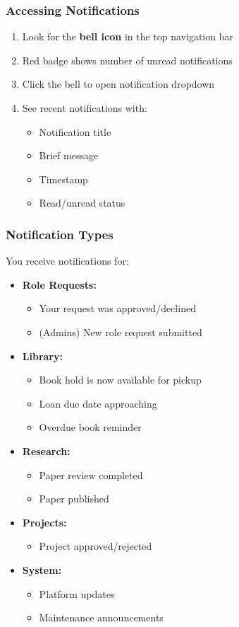 \documentclass[12pt,a4paper]{article}
\begin{document}
\subsubsection{Accessing Notifications}
\begin{enumerate}[leftmargin=*]
    \item Look for the \textbf{bell icon} in the top navigation bar
    \item Red badge shows number of unread notifications
    \item Click the bell to open notification dropdown
    \item See recent notifications with:
        \begin{itemize}
            \item Notification title
            \item Brief message
            \item Timestamp
            \item Read/unread status
        \end{itemize}
\end{enumerate}

\subsubsection{Notification Types}
You receive notifications for:
\begin{itemize}[leftmargin=*]
    \item \textbf{Role Requests:}
        \begin{itemize}
            \item Your request was approved/declined
            \item (Admins) New role request submitted
        \end{itemize}
    \item \textbf{Library:}
        \begin{itemize}
            \item Book hold is now available for pickup
            \item Loan due date approaching
            \item Overdue book reminder
        \end{itemize}
    \item \textbf{Research:}
        \begin{itemize}
            \item Paper review completed
            \item Paper published
        \end{itemize}
    \item \textbf{Projects:}
        \begin{itemize}
            \item Project approved/rejected
        \end{itemize}
    \item \textbf{System:}
        \begin{itemize}
            \item Platform updates
            \item Maintenance announcements
        \end{itemize}
\end{itemize}
\end{document}
